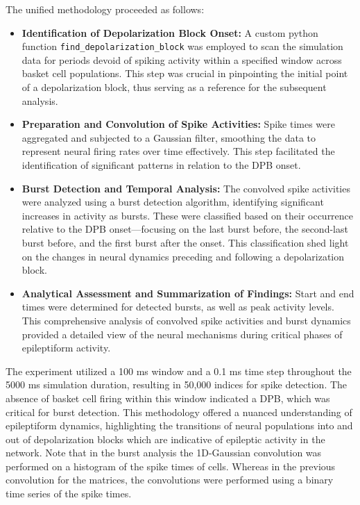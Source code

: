 \noindent The unified methodology proceeded as follows:
\begin{itemize}
    \item \textbf{Identification of Depolarization Block Onset:} A custom python function \lstinline{find_depolarization_block} was employed to scan the simulation data for periods devoid of spiking activity within a specified window across basket cell populations.
          This step was crucial in pinpointing the initial point of a depolarization block, thus serving as a reference for the subsequent analysis.

    \item \textbf{Preparation and Convolution of Spike Activities:} Spike times were aggregated and subjected to a Gaussian filter, smoothing the data to represent neural firing rates over time effectively.
          This step facilitated the identification of significant patterns in relation to the DPB onset.

    \item \textbf{Burst Detection and Temporal Analysis:} The convolved spike activities were analyzed using a burst detection algorithm, identifying significant increases in activity as bursts.
          These were classified based on their occurrence relative to the DPB onset—focusing on the last burst before, the second-last burst before, and the first burst after the onset. This classification shed light on the changes in neural dynamics preceding and following a depolarization block.

    \item \textbf{Analytical Assessment and Summarization of Findings:} Start and end times were determined for detected bursts, as well as peak activity levels.
          This comprehensive analysis of convolved spike activities and burst dynamics provided a detailed view of the neural mechanisms during critical phases of epileptiform activity.
\end{itemize}

\noindent The experiment utilized a 100 ms window and a 0.1 ms time step throughout the 5000 ms simulation duration, resulting in 50,000 indices for spike detection.
The absence of basket cell firing within this window indicated a DPB, which was critical for burst detection.
This methodology offered a nuanced understanding of epileptiform dynamics, highlighting the transitions of neural populations into and out of depolarization blocks which are indicative of epileptic activity in the network.
Note that in the burst analysis the 1D-Gaussian convolution was performed on a histogram of the spike times of cells. Whereas in the previous convolution for the matrices, the convolutions were performed using a binary time series of the spike times.

